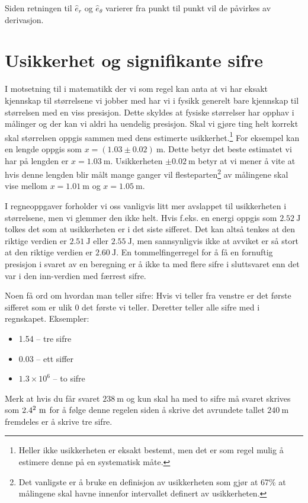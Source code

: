 \documentclass[a4paper,norsk,12pt]{book}
\def\er{\ensuremath{\hat{e}_r}}
\def\eth{\ensuremath{\hat{e}_\theta}}
\begin{document}
Siden retningen til $\er$ og $\eth$ varierer fra punkt til punkt vil de påvirkes av derivasjon. 

\chapter{Usikkerhet og signifikante sifre}
I motsetning til i matematikk der vi som regel kan anta at vi har eksakt kjennskap til størrelsene vi jobber med har vi i fysikk generelt bare kjennskap til størrelsen med en viss presisjon. Dette skyldes at fysiske størrelser har opphav i målinger og der kan vi aldri ha uendelig presisjon. Skal vi gjøre ting helt korrekt skal størrelsen oppgis sammen med dens estimerte usikkerhet.\footnote{Heller ikke usikkerheten er eksakt bestemt, men det er som regel mulig å estimere denne på en systematisk måte.
} For eksempel kan en lengde oppgis som $x=(1.03\pm0.02)~\mathrm{m}$. Dette betyr det beste estimatet vi har på lengden er $x = 1.03~\mathrm{m}$. Usikkerheten $\pm0.02~\mathrm{m}$ betyr at vi mener å vite at hvis denne lengden blir målt mange ganger vil flesteparten\footnote{Det vanligste er å bruke en definisjon av usikkerheten som gjør at 67\% at målingene skal havne innenfor intervallet definert av usikkerheten.} av målingene skal vise mellom $x=1.01~\mathrm{m}$ og $x=1.05~\mathrm{m}$. 

I regneoppgaver forholder vi oss vanligvis litt mer avslappet til usikkerheten i størrelsene, men vi glemmer den ikke helt. Hvis f.eks. en energi oppgis som $2.52~\mathrm{J}$ tolkes det som at usikkerheten er i det siste sifferet. Det kan altså tenkes at den riktige verdien er $2.51~\mathrm{J}$ eller $2.55~\mathrm{J}$, men sannsynligvis ikke at avviket er så stort at den riktige verdien er $2.60~\mathrm{J}$. En tommelfingerregel for å få en fornuftig presisjon i svaret av en beregning er å ikke ta med flere sifre i sluttsvaret enn det var i den inn-verdien med færrest sifre.

Noen få ord om hvordan man teller sifre: Hvis vi teller fra venstre er det første sifferet som er ulik 0 det første vi teller. Deretter teller alle sifre med i regnskapet. Eksempler:
\begin{itemize}
	\item 1.54 -- tre sifre
	\item 0.03 -- ett siffer
	\item$1.3\times10^6$ -- to sifre
\end{itemize}
Merk at hvis du får svaret $238~\mathrm{m}$ og kun skal ha med to sifre må svaret skrives som $2.4\time10^2~\mathrm{m}$ for å følge denne regelen siden å skrive det avrundete tallet $240~\mathrm{m}$ fremdeles er å skrive tre sifre.
\end{document}

